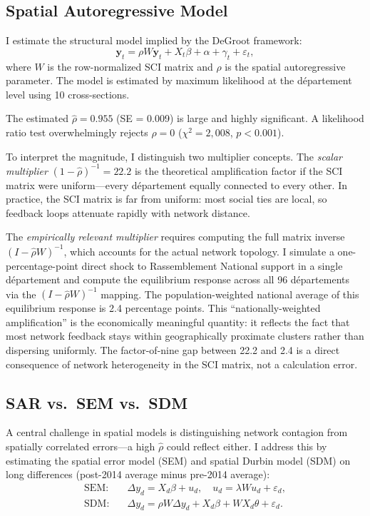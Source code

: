 \documentclass[12pt]{article}
\newcommand{\rn}{Rassemblement National}
\newcommand{\dept}{d\'{e}partement}
\newcommand{\depts}{d\'{e}partements}
\begin{document}
\subsection{Spatial Autoregressive Model}

I estimate the structural model implied by the DeGroot framework:
\begin{equation}
\mathbf{y}_t = \rho W \mathbf{y}_t + X_t \beta + \alpha + \gamma_t + \varepsilon_t,
\label{eq:sar}
\end{equation}
where $W$ is the row-normalized SCI matrix and $\rho$ is the spatial autoregressive parameter. The model is estimated by maximum likelihood at the \dept{} level using 10 cross-sections.

The estimated $\hat{\rho} = 0.955$ (SE = 0.009) is large and highly significant. A likelihood ratio test overwhelmingly rejects $\rho = 0$ ($\chi^2 = 2{,}008$, $p < 0.001$).

To interpret the magnitude, I distinguish two multiplier concepts. The \textit{scalar multiplier} $(1 - \hat{\rho})^{-1} = 22.2$ is the theoretical amplification factor if the SCI matrix were uniform---every \dept{} equally connected to every other. In practice, the SCI matrix is far from uniform: most social ties are local, so feedback loops attenuate rapidly with network distance.

The \textit{empirically relevant multiplier} requires computing the full matrix inverse $(I - \hat{\rho} W)^{-1}$, which accounts for the actual network topology. I simulate a one-percentage-point direct shock to \rn{} support in a single \dept{} and compute the equilibrium response across all 96 \depts{} via the $(I - \hat{\rho} W)^{-1}$ mapping. The population-weighted national average of this equilibrium response is 2.4 percentage points. This ``nationally-weighted amplification'' is the economically meaningful quantity: it reflects the fact that most network feedback stays within geographically proximate clusters rather than dispersing uniformly. The factor-of-nine gap between 22.2 and 2.4 is a direct consequence of network heterogeneity in the SCI matrix, not a calculation error.

\subsection{SAR vs.\ SEM vs.\ SDM}

A central challenge in spatial models is distinguishing network contagion from spatially correlated errors---a high $\hat{\rho}$ could reflect either. I address this by estimating the spatial error model (SEM) and spatial Durbin model (SDM) on long differences (post-2014 average minus pre-2014 average):
\begin{align}
\text{SEM:} \quad & \Delta y_d = X_d \beta + u_d, \quad u_d = \lambda W u_d + \varepsilon_d, \label{eq:sem} \\
\text{SDM:} \quad & \Delta y_d = \rho W \Delta y_d + X_d \beta + W X_d \theta + \varepsilon_d. \label{eq:sdm}
\end{align}
\end{document}
